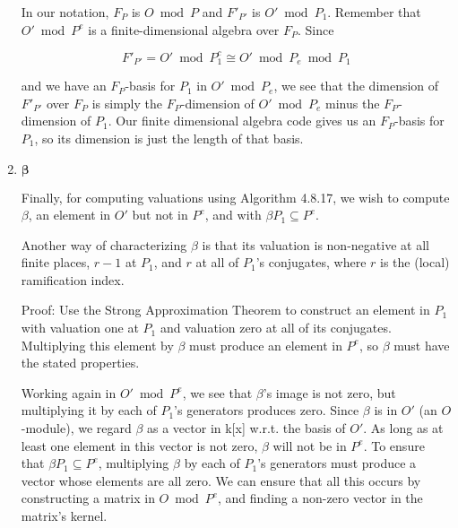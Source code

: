 \documentclass{article}
\begin{document}
\begin{enumerate}
In our notation, $F_P$ is $O \bmod P$ and $F'_{P'}$ is $O' \bmod P_1$.
Remember that $O' \bmod P^e$ is a finite-dimensional algebra over
$F_P$.  Since

$$F'_{P'} = O' \bmod P_1^c \cong O' \bmod P_e \bmod P_1$$

and we have an $F_P$-basis for $P_1$ in $O' \bmod P_e$, we see that the
dimension of $F'_{P'}$ over $F_P$ is simply the $F_P$-dimension of $O' \bmod P_e$
minus the $F_P$-dimension of $P_1$.  Our finite dimensional algebra
code gives us an $F_P$-basis for $P_1$, so its dimension is just
the length of that basis.

\item $\boldsymbol{\beta}$

Finally, for computing valuations using \cite{cohen} Algorithm 4.8.17,
we wish to compute $\beta$, an element in $O'$ but not in $P^e$, and
with $\beta P_1 \subseteq P^e$.

Another way of characterizing $\beta$ is that its valuation is
non-negative at all finite places, $r-1$ at $P_1$, and $r$ at all of
$P_1$'s conjugates, where $r$ is the (local) ramification index.

Proof: Use the Strong Approximation Theorem to construct an element in
$P_1$ with valuation one at $P_1$ and valuation zero at all of its
conjugates.  Multiplying this element by $\beta$ must produce an
element in $P^e$, so $\beta$ must have the stated properties.

Working again in $O' \bmod P^e$,
we see that $\beta$'s image is not zero, but multiplying it
by each of $P_1$'s generators produces zero.
Since $\beta$ is in $O'$ (an $O$-module), we regard $\beta$ as
a vector in k[x] w.r.t. the basis of $O'$.  As long as
at least one element in this vector is not zero,
$\beta$ will not be in $P^e$.  To ensure that
$\beta P_1 \subseteq P^e$, multiplying $\beta$ by each of $P_1$'s
generators must produce a vector whose elements are all zero.
We can ensure that all this
occurs by constructing a matrix in $O \bmod P^e$,
and finding a non-zero vector in
the matrix's kernel.

\end{enumerate}
\end{document}
